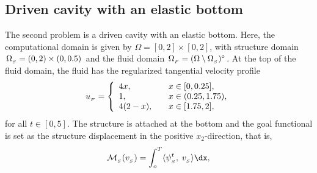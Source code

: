 \begin{figure}
\end{figure}

\subsection{Driven cavity with an elastic bottom}

The second problem is a driven cavity with an elastic bottom. Here,
the computational domain is given by $\Omega = [0,2]\times [0,2]$,
with structure domain $\Omega_{_{S}} = (0, 2)\times (0, 0.5)$ and the fluid
domain $\Omega_{_{F}} = (\Omega\setminus \Omega_{_{S}})^{\circ}$. At the top of the fluid
domain, the fluid has the regularized tangential velocity profile
\begin{equation}
u_{_{F}} = 
\left\{
\begin{array}{lcl}
4x,& &x\in[0, 0.25],\\
1,& &x\in(0.25 ,1.75),\\
4(2-x),&  &x\in[1.75, 2], 
\end{array}
\right.
\end{equation}
for all $t \in [0,5]$. The structure is attached at the bottom and the
goal functional is set as the structure displacement in the positive
$x_2$-direction, that is, 
\begin{equation}
\label{selim:eq:goalfunctional_cavity}
\M_{_{S}}(v_{_{S}}) = \int_o^T \langle \psi^t_{_{S}},\; v_{_{S}}\rangle \dx, 
\end{equation}

